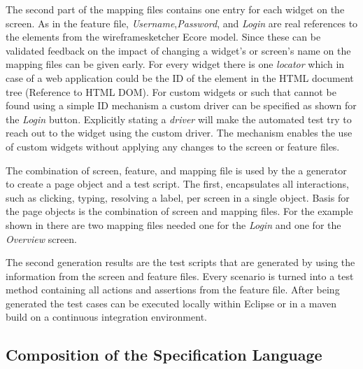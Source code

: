 \documentclass{sig-alternate-05-2015}
\begin{document}
The second part of the mapping files contains one entry for each widget on the screen.
As in the feature file, \textit{Username},\textit{Password}, and \textit{Login} are real references to the elements from the wireframesketcher Ecore model.
Since these can be validated feedback on the impact of changing a widget's or screen's name on the mapping files can be given early.
For every widget there is one \textit{locator} which in case of a web application could be the ID of the element in the HTML document tree (Reference to HTML DOM).
For custom widgets or such that cannot be found using a simple ID mechanism a custom driver can be specified as shown for the \textit{Login} button.
Explicitly stating a \textit{driver} will make the automated test try to reach out to the widget using the custom driver. 
The mechanism enables the use of custom widgets without applying any changes to the screen or feature files.

The combination of screen, feature, and mapping file is used by the a generator to create a page object and a test script.
The first, encapsulates all interactions, such as clicking, typing, resolving a label, per screen in a single object.
Basis for the page objects is the combination of screen and mapping files.
For the example shown in  there are two mapping files needed one for the \textit{Login} and one for the \textit{Overview} screen.

The second generation results are the test scripts that are generated by using the information from the screen and feature files.
Every scenario is turned into a test method containing all actions and assertions from the feature file.
After being generated the test cases can be executed locally within Eclipse or in a maven build on a continuous integration environment.


\subsection{Composition of the Specification Language}
\end{document}

